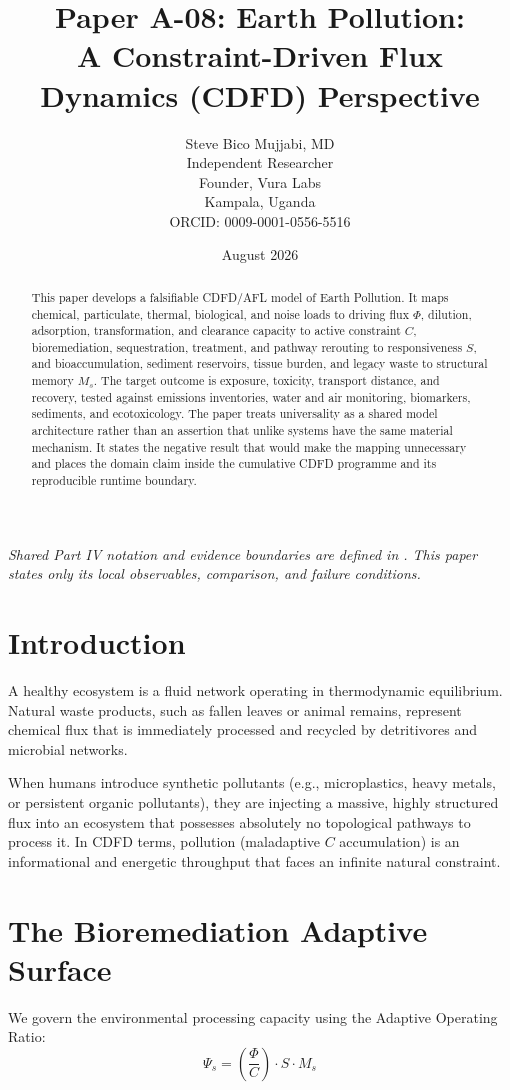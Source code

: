 \documentclass[11pt,a4paper]{article}
\title{\textbf{Paper A-08: Earth Pollution:\\ A Constraint-Driven Flux Dynamics (CDFD) Perspective}}
\author{Steve Bico Mujjabi, MD\\
\small Independent Researcher\\
\small Founder, Vura Labs\\
\small Kampala, Uganda\\
\small ORCID: 0009-0001-0556-5516}
\date{August 2026}
\begin{document}
\maketitle

\noindent\textit{Shared Part IV notation and evidence boundaries are defined in . This paper states only its local observables, comparison, and failure conditions.}


\begin{abstract}
This paper develops a falsifiable CDFD/AFL model of Earth Pollution. It maps chemical, particulate, thermal, biological, and noise loads to driving flux $\Phi$, dilution, adsorption, transformation, and clearance capacity to active constraint $C$, bioremediation, sequestration, treatment, and pathway rerouting to responsiveness $S$, and bioaccumulation, sediment reservoirs, tissue burden, and legacy waste to structural memory $M_s$. The target outcome is exposure, toxicity, transport distance, and recovery, tested against emissions inventories, water and air monitoring, biomarkers, sediments, and ecotoxicology. The paper treats universality as a shared model architecture rather than an assertion that unlike systems have the same material mechanism. It states the negative result that would make the mapping unnecessary and places the domain claim inside the cumulative CDFD programme and its reproducible runtime boundary.
\end{abstract}

\section{Introduction}

A healthy ecosystem is a fluid network operating in thermodynamic equilibrium. Natural waste products, such as fallen leaves or animal remains, represent chemical flux that is immediately processed and recycled by detritivores and microbial networks.

When humans introduce synthetic pollutants (e.g., microplastics, heavy metals, or persistent organic pollutants), they are injecting a massive, highly structured flux into an ecosystem that possesses absolutely no topological pathways to process it. In CDFD terms, pollution (maladaptive $C$ accumulation) is an informational and energetic throughput that faces an infinite natural constraint.

\section{The Bioremediation Adaptive Surface}
We govern the environmental processing capacity using the Adaptive Operating Ratio:
\begin{equation}
    \Psi_s = \left( \frac{\Phi}{C} \right) \cdot S \cdot M_s
\end{equation}
\end{document}
